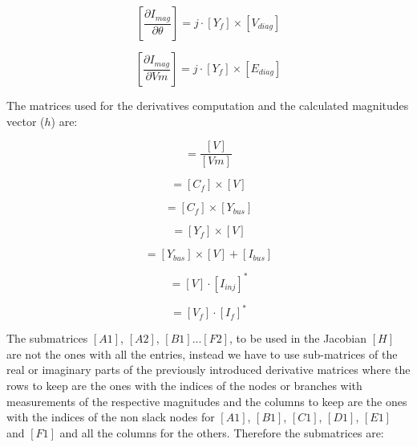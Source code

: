\documentclass[nols,a4paper,twoside,notoc,fleqn]{tufte-book}
\begin{document}

\begin{equation}
\left[ \frac{\partial I_{mag}}{\partial \theta} \right]   = j \cdot [Y_f] \times [V_{diag} ]
\end{equation}

\begin{equation}
\left[ \frac{\partial I_{mag}}{\partial Vm}  \right]  =j \cdot [Y_f] \times [E_{diag} ]
\end{equation}

The matrices used for the derivatives computation and the calculated magnitudes vector ($h$) are:

\begin{equation}
[E]=\frac{[V]}{[Vm]}
\end{equation}  

\begin{equation}
[V_f] = [C_f] \times [V]
\label{eq:voltage_from}
\end{equation}

\begin{equation}
[Y_f] = [C_f] \times [Y_{bus} ]
\label{eq:admittace_from}
\end{equation}

\begin{equation}
[I_f] = [Y_f] \times [V] 
\label{eq:current_from}
\end{equation}

\begin{equation}
[I_{inj}] = [Y_{bus}]  \times  [V] + [I_{bus}]
\label{eq:current_inj}
\end{equation}

\begin{equation}
[S_{inj}] = [V]  \cdot  [I_{inj}]^*
\label{eq:power_injection}
\end{equation}

\begin{equation}
[S_f] = [V_{f}] \cdot [I_{f}]^*
\label{eq:power_from}
\end{equation}

The submatrices $[A1]$, $[A2]$, $[B1]$...$[F2]$, to be used in the Jacobian $[H]$ are not the ones with all the entries, instead we have to use sub-matrices of the real or imaginary parts of the previously introduced derivative matrices where the rows to keep are the ones with the indices of the nodes or branches with measurements of the respective magnitudes and the columns to keep are the ones with the indices of the non slack nodes for $[A1]$, $[B1]$, $[C1]$, $[D1]$, $[E1]$ and $[F1]$ and all the columns for the others. Therefore the submatrices are:
\end{document}
